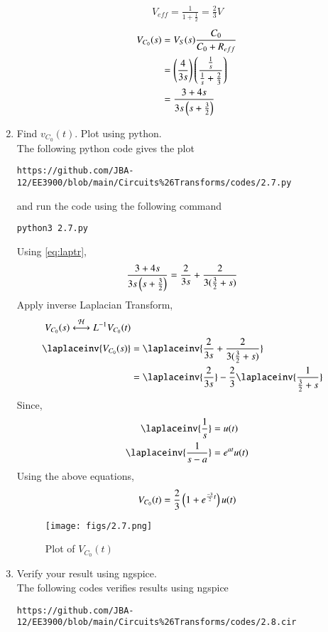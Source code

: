 \documentclass[journal,12pt,twocolumn]{IEEEtran}
\renewcommand\thesection{\arabic{section}}
\begin{document}
\begin{enumerate}[label=\arabic*.,ref=\thesection.\theenumi]
\begin{align}
V_{eff}=\frac{1}{1+\frac{1}{2}} = \frac{2}{3}V
\end{align}
\begin{align}
V_{C_0}(s)&=V_{S}(s)\frac{C_{0}}{C_{0}+R_{eff}}\\
&=\left(\frac{4}{3s}\right)\left(\frac{\frac{1}{s}}{\frac{1}{s}+\frac{2}{3}}\right)\\
\label{eq:laptr}
&=\frac{3+4s}{3s\left(s+\frac{3}{2}\right)}
\end{align}
\item Find $v_{C_0}(t)$.  Plot using python.\\
\solution The following python code gives the plot
\begin{lstlisting}
https://github.com/JBA-12/EE3900/blob/main/Circuits%26Transforms/codes/2.7.py
\end{lstlisting}
and run the code using the following command 
\begin{lstlisting}
python3 2.7.py
\end{lstlisting}
Using \eqref{eq:laptr},
\begin{align}
\frac{3+4s}{3s\left(s+\frac{3}{2}\right)}&=\frac{2}{3s}+\frac{2}{3(\frac{3}{2}+s)}
\end{align}
Apply inverse Laplacian Transform,
\begin{align}
V_{C_0}(s)\system{L^{-1}}V_{C_0}(t)\\
\laplaceinv{V_{C_0}(s)}&=\laplaceinv{\frac{2}{3s}+\frac{2}{3(\frac{3}{2}+s)}}\\
&=	\laplaceinv{\frac{2}{3s}}-\frac{2}{3}\laplaceinv{\frac{1}{\frac{3}{2}+s}}
\end{align}
Since,
\begin{align}
\laplaceinv{\frac1s}&=u(t)\\
\laplaceinv{\frac{1}{s-a}}&=e^{at}u(t)
\end{align}
Using the above equations,
\begin{align}
V_{C_0}(t)=\frac{2}{3}\left( 1+e^{\frac{-3}{2} t}\right)u(t)
\end{align}
\begin{figure}[!ht]
\centering
\texttt{[image: figs/2.7.png]}
\caption{Plot of $V_{C_0}(t)$}
\label{fig:lap}
\end{figure}
\item Verify your result using ngspice.\\
\solution The following codes verifies results using ngspice
\begin{lstlisting}
https://github.com/JBA-12/EE3900/blob/main/Circuits%26Transforms/codes/2.8.cir

\end{lstlisting}
\end{enumerate}
\end{document}
